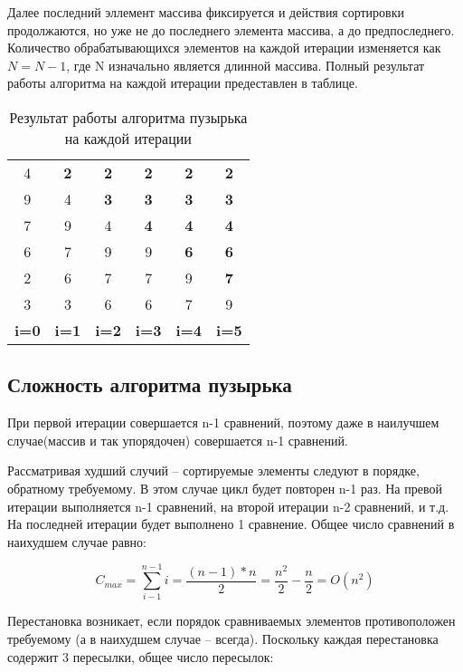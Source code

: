 Далее последний эллемент массива фиксируется и действия сортировки продолжаются, но уже не до последнего элемента массива, а до предпоследнего. Количество обрабатывающихся элементов на каждой итерации изменяется как $N=N-1$, где N изначально является длинной массива. Полный результат работы алгоритма на каждой итерации предеставлен в таблице.

\begin{table}
	\caption{Результат работы алгоритма пузырька на каждой итерации}\label{table:bubbleResult}
	\begin{center}
		\begin{tabular}{cccccc}
            4 & \textbf{2} & \textbf{2} & \textbf{2} & \textbf{2} & \textbf{2} \\
            9 & 4 & \textbf{3} & \textbf{3} & \textbf{3} & \textbf{3} \\
            7 & 9 & 4 & \textbf{4} & \textbf{4} & \textbf{4} \\
            6 & 7 & 9 & 9 & \textbf{6} & \textbf{6} \\
            2 & 6 & 7 & 7 & 9 & \textbf{7} \\
            3 & 3 & 6 & 6 & 7 & 9 \\
            \textbf{i=0} & \textbf{i=1} & \textbf{i=2} & \textbf{i=3} & \textbf{i=4} & \textbf{i=5}\\
		\end{tabular}
	\end{center}
\end{table}

\subsection{ Сложность алгоритма пузырька\cite{bib1}}
При первой итерации совершается n-1 сравнений, поэтому даже в наилучшем случае(массив и так упорядочен) совершается n-1 сравнений.

Рассматривая худший случий -- сортируемые элементы следуют в порядке, обратному требуемому. В этом случае цикл будет повторен n-1 раз. На превой итерации выполняется n-1 сравнений, на второй итерации n-2 сравнений, и т.д. На последней итерации будет выполнено 1 сравнение. Общее число сравнений в наихудшем случае равно:

\begin{equation}
    C_{max} = \sum_{i-1}^{n-1} i = \frac{(n-1)*n}{2} = \frac{n^2}{2}-\frac{n}{2}=O(n^2)
\end{equation}

Перестановка возникает, если порядок сравниваемых элементов противоположен требуемому (а в наихудшем случае -- всегда). Поскольку каждая перестановка содержит 3 пересылки, общее число пересылок:

